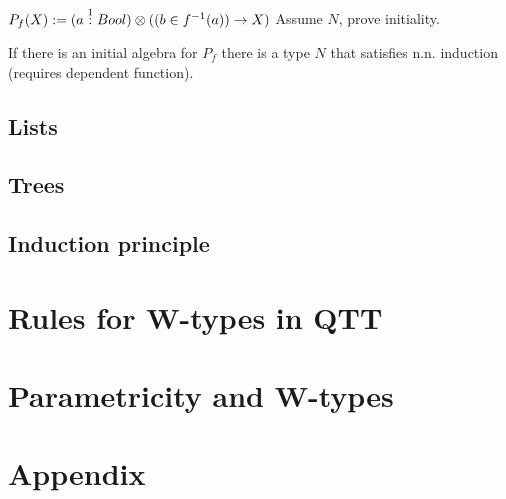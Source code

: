 \documentclass[12pt,a4paper]{article}
\begin{document}
$P_f(X) := (a \overset{1}{:} Bool)\otimes((b \in f^{-1}(a)) \to X)$
Assume $N$, prove initiality.

If there is an initial algebra for $P_f$ there is a type $N$ that satisfies n.n. induction (requires dependent function).
\subsection{Lists}
\subsection{Trees}

\subsection{Induction principle}

\section{Rules for W-types in QTT}
\section{Parametricity and W-types}

\newpage
\section{Appendix}
\end{document}
